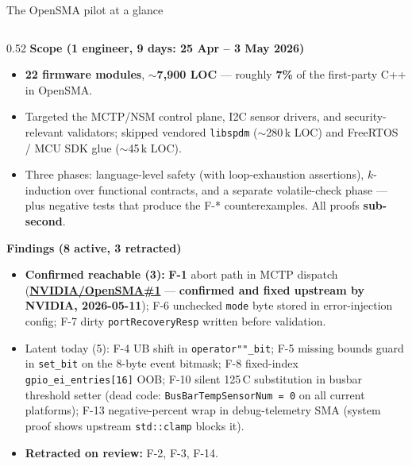 \documentclass[aspectratio=169,11pt]{beamer}
\newcommand{\hil}[1]{\textbf{\textcolor{nvgreendark}{#1}}}
\newcommand{\bad}[1]{\textbf{\textcolor{nvred}{#1}}}
\begin{document}
\begin{frame}{The OpenSMA pilot at a glance}
  \begin{columns}[T,onlytextwidth]
    \begin{column}{0.52\textwidth}
      {\footnotesize\textbf{Scope (1 engineer, 9 days: 25 Apr -- 3 May 2026)}}
      \begin{itemize}\setlength\itemsep{0.05em}
        \scriptsize
        \item \hil{22 firmware modules}, $\sim$\hil{7{,}900 LOC} —
              roughly \hil{7\%} of the first-party C++ in OpenSMA.
        \item Targeted the MCTP/NSM control plane, I2C sensor drivers,
              and security-relevant validators; skipped vendored
              \texttt{libspdm} ($\sim$280\,k LOC) and FreeRTOS / MCU SDK
              glue ($\sim$45\,k LOC).
        \item Three phases: language-level safety (with loop-exhaustion
              assertions), $k$-induction over functional contracts, and
              a separate volatile-check phase --- plus negative tests
              that produce the F-* counterexamples. All proofs
              \hil{sub-second}.
      \end{itemize}

      \vspace{0.3em}
      {\footnotesize\textbf{Findings (8 active, 3 retracted)}}
      \begin{itemize}\setlength\itemsep{0.05em}
        \tiny
        \item \bad{Confirmed reachable (3):}
              \bad{F-1} abort path in MCTP dispatch
              (\href{https://github.com/NVIDIA/OpenSMA/issues/1}{\hil{NVIDIA/OpenSMA\#1}}
              --- \hil{confirmed and fixed upstream by NVIDIA, 2026-05-11});
              F-6 unchecked \texttt{mode} byte stored in error-injection
              config; F-7 dirty \texttt{portRecoveryResp} written before
              validation.
        \item Latent today (5):
              F-4 UB shift in \texttt{operator""\_bit};
              F-5 missing bounds guard in \texttt{set\_bit} on the
              8-byte event bitmask;
              F-8 fixed-index \texttt{gpio\_ei\_entries[16]} OOB;
              F-10 silent 125\,\textdegree{}C substitution in busbar
              threshold setter (dead code: \texttt{BusBarTempSensorNum\,=\,0}
              on all current platforms);
              F-13 negative-percent wrap in debug-telemetry SMA
              (system proof shows upstream \texttt{std::clamp} blocks it).
        \item \hil{Retracted on review:} F-2, F-3, F-14.
      \end{itemize}
    \end{column}


\end{columns}
\end{frame}
\end{document}
